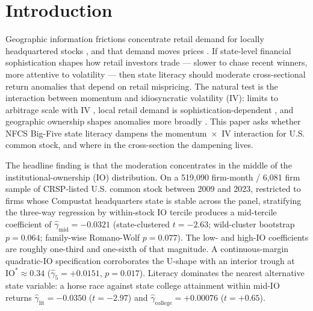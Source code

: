 \section{Introduction}

Geographic information frictions concentrate retail demand for locally headquartered stocks \citep{covalMoskowitz1999, ivkovicWeisbenner2005}, and that demand moves prices \citep{hongKubikStein2008}. If state-level financial sophistication shapes how retail investors trade --- slower to chase recent winners, more attentive to volatility --- then state literacy should moderate cross-sectional return anomalies that depend on retail mispricing. The natural test is the interaction between momentum and idiosyncratic volatility (IV): limits to arbitrage scale with IV \citep{shleiferVishny1997, pontiff2006}, local retail demand is sophistication-dependent \citep{calvetCampbellSodini2009, grinblattKeloharjuLinnainmaa2012}, and geographic ownership shapes anomalies more broadly \citep{bernileKumarSulaeman2015}. This paper asks whether NFCS Big-Five state literacy \citep{lusardiMitchell2014} dampens the momentum~$\times$~IV interaction for U.S. common stock, and where in the cross-section the dampening lives.

The headline finding is that the moderation concentrates in the middle of the institutional-ownership (IO) distribution. On a 519{,}090 firm-month / 6{,}081 firm sample of CRSP-listed U.S. common stock between 2009 and 2023, restricted to firms whose Compustat headquarters state is stable across the panel, stratifying the three-way regression by within-stock IO tercile produces a mid-tercile coefficient of $\hat\gamma_{\text{mid}} = -0.0321$ (state-clustered $t = -2.63$; wild-cluster bootstrap $p = 0.064$; family-wise Romano-Wolf $p = 0.077$). The low- and high-IO coefficients are roughly one-third and one-sixth of that magnitude. A continuous-margin quadratic-IO specification corroborates the U-shape with an interior trough at $\mathrm{IO}^{\ast} \approx 0.34$ ($\hat\gamma_{5} = +0.0151$, $p = 0.017$). Literacy dominates the nearest alternative state variable: a horse race against state college attainment within mid-IO returns $\hat\gamma_{\text{lit}} = -0.0350$ ($t = -2.97$) and $\hat\gamma_{\text{college}} = +0.00076$ ($t = +0.65$).

